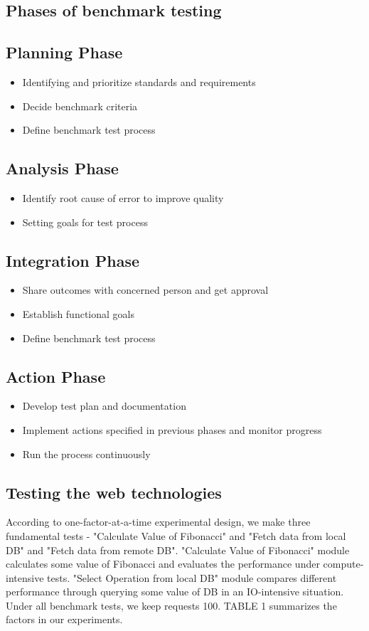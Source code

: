 \documentclass[../thesis.tex]{subfiles}
\begin{document}
\subsection{Phases of benchmark testing}
\subsection*{Planning Phase}
\begin{itemize}
	\item Identifying and prioritize standards and requirements
	\item Decide benchmark criteria
	\item Define benchmark test process
\end{itemize}
\subsection*{Analysis Phase}
\begin{itemize}
	\item Identify root cause of error to improve quality
	\item Setting goals for test process
\end{itemize}
\subsection*{Integration Phase}
\begin{itemize}
	\item Share outcomes with concerned person and get approval
	\item Establish functional goals
	\item Define benchmark test process
\end{itemize}
\subsection*{Action Phase}
\begin{itemize}
	\item Develop test plan and documentation
	\item Implement actions specified in previous phases and monitor progress
	\item Run the process continuously
\end{itemize}

\subsection{Testing the web technologies}
According to one-factor-at-a-time experimental design, we make three fundamental tests - "Calculate Value of Fibonacci" and "Fetch data from local DB" and "Fetch data from remote DB". "Calculate Value of Fibonacci" module calculates some value of Fibonacci and evaluates the performance under compute-intensive tests. "Select Operation from local DB" module compares different performance through querying some value of DB in an IO-intensive situation. Under all benchmark tests, we keep requests 100. TABLE 1 summarizes the factors in our experiments.
\end{document}
